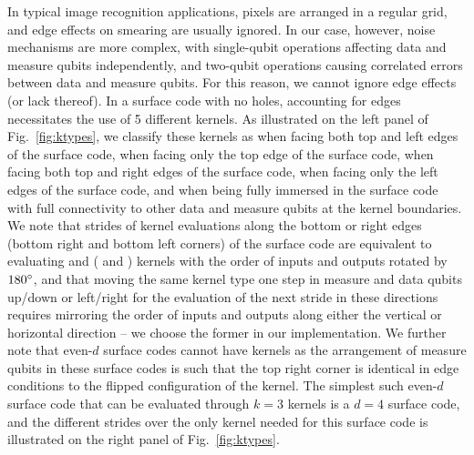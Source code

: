 In typical image recognition applications, pixels are arranged in a regular grid, and edge effects on smearing are usually ignored. In our case, however, noise mechanisms are more complex, with single-qubit operations affecting data and measure qubits independently, and two-qubit operations causing correlated errors between data and measure qubits. For this reason, we cannot ignore edge effects (or lack thereof). 
In a surface code with no holes, accounting for edges necessitates the use of 5 different kernels. As illustrated on the left panel of Fig.~\ref{fig:ktypes}, we classify these kernels as  when facing both top and left edges of the surface code,  when facing only the top edge of the surface code,  when facing both top and right edges of the surface code,  when facing only the left edges of the surface code, and  when being fully immersed in the surface code with full connectivity to other data and measure qubits at the kernel boundaries. We note that strides of kernel evaluations along the bottom or right edges (bottom right and bottom left corners) of the surface code are equivalent to evaluating  and  ( and ) kernels with the order of inputs and outputs rotated by $180^\circ$, and that moving the same kernel type one step in measure and data qubits up/down or left/right for the evaluation of the next stride in these directions requires mirroring the order of inputs and outputs along either the vertical or horizontal direction -- we choose the former in our implementation. We further note that even-$d$ surface codes cannot have  kernels as the arrangement of measure qubits in these surface codes is such that the top right corner is identical in edge conditions to the flipped configuration of the  kernel. The simplest such even-$d$ surface code that can be evaluated through $k=3$ kernels is a $d=4$ surface code, and the different strides over the only  kernel needed for this surface code is illustrated on the right panel of Fig.~\ref{fig:ktypes}.

